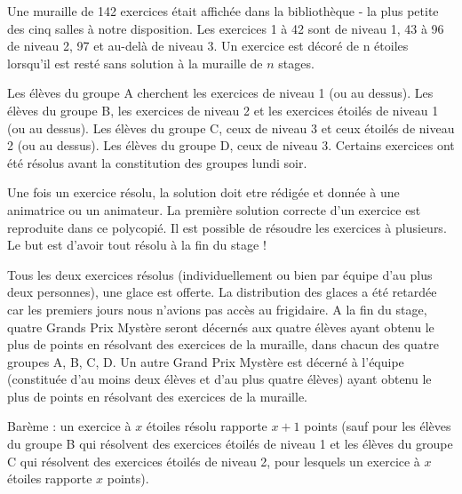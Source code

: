 Une muraille de 142 exercices était affichée dans la bibliothèque - la plus petite des cinq salles à notre disposition. Les exercices 1 à 42 sont de niveau 1, 43 à 96 de niveau 2, 97 et au-delà de niveau 3. Un exercice est décoré de n étoiles lorsqu'il est resté sans solution à la muraille de $n$ stages.

Les élèves du groupe A cherchent les exercices de niveau 1 (ou au dessus). Les élèves du groupe B, les exercices de niveau 2 et les exercices étoilés de niveau 1 (ou au dessus). Les élèves du groupe C, ceux de niveau 3 et ceux étoilés de niveau 2 (ou au dessus). Les élèves du groupe D, ceux de niveau 3. Certains exercices ont été résolus avant la constitution des groupes lundi soir.

Une fois un exercice résolu, la solution doit etre rédigée et donnée à une animatrice ou un animateur. La première solution correcte d'un exercice est reproduite dans ce polycopié. Il est possible de résoudre les exercices à plusieurs. Le but est d'avoir tout résolu à la fin du stage !

Tous les deux exercices résolus (individuellement ou bien par équipe d'au plus deux personnes), une glace est offerte. La distribution des glaces a été retardée car les premiers jours nous n'avions pas accès au frigidaire. A la fin du stage, quatre Grands Prix Mystère seront décernés aux quatre élèves ayant obtenu le plus de points en résolvant des exercices de la muraille, dans chacun des quatre groupes A, B, C, D. Un autre Grand Prix Mystère est décerné à l'équipe (constituée d'au moins deux élèves et d'au plus quatre élèves) ayant obtenu le plus de points en résolvant des exercices de la muraille.

Barème : un exercice à $x$ étoiles résolu rapporte $x+1$ points (sauf pour les élèves du groupe B qui résolvent des exercices étoilés de niveau 1 et les élèves du groupe C qui résolvent des exercices étoilés de niveau 2, pour lesquels un exercice à $x$ étoiles rapporte $x$ points).

